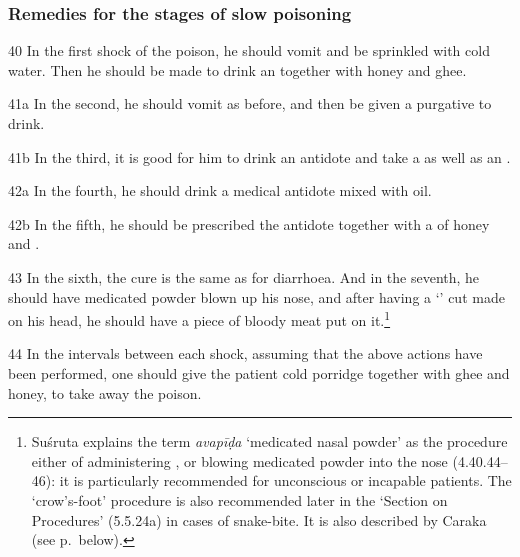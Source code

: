 \begin{translation}
    
    \subsubsection{Remedies for the stages of slow poisoning}
    \item[40]
    In the first shock of the poison, he should vomit and be sprinkled with cold
    water. Then he should be made to drink an  together
    with honey and ghee.
    \item[41a]
    In the second, he should vomit as before, and then be given a purgative to
    drink.
    \item[41b]
    In the third, it is good for him to drink an antidote and take a
     as well as an .
    \item[42a]
    In the fourth, he should drink a medical antidote mixed with oil.
    \item[42b]
    In the fifth, he should be prescribed the antidote together with a
     of honey and
    .
    \item[43]
    In the sixth, the cure is the same as for diarrhoea.
    And in the seventh, he should have medicated powder blown up his nose, and
    after having a `' cut made on his head, he
    should have a piece of bloody meat put on
    it.\footnote{\label{su:kakapada}Suśruta explains the term \emph{avapīḍa}
    `medicated nasal powder' as the procedure either of administering
    , or blowing medicated powder into the nose
    (4.40.44--46): it is particularly recommended for unconscious or incapable
    patients.  The `crow's-foot' procedure is also recommended later in the
    `Section on Procedures' (5.5.24a) in cases of snake-bite. It is also
    described by Caraka (see p.\,\pageref{sa:kakapada} below).}
    
    \item[44]
    In the intervals between each shock, assuming that the above actions have
    been performed, one should give the patient cold porridge together with ghee
    and honey, to take away the poison.
    

\end{translation}
